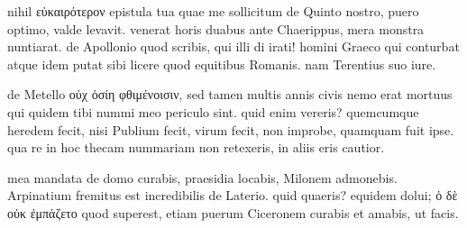 


 nihil εὐκαιρότερον epistula tua quae me sollicitum de Quinto nostro, puero optimo, valde levavit. venerat horis duabus ante Chaerippus, mera monstra nuntiarat. de Apollonio quod scribis, qui illi di irati! homini Graeco qui conturbat atque idem putat sibi licere quod equitibus Romanis. nam Terentius suo iure.

 de Metello οὐχ ὁσίη φθιμένοισιν, sed tamen multis annis civis nemo erat mortuus qui quidem tibi nummi meo periculo sint. quid enim vereris? quemcumque heredem fecit, nisi Publium fecit, virum fecit, non improbe, quamquam fuit ipse. qua re in hoc thecam nummariam non retexeris, in aliis eris cautior.

 mea mandata de domo curabis, praesidia locabis, Milonem admonebis. Arpinatium fremitus est incredibilis de Laterio. quid quaeris? equidem dolui; ὁ δὲ οὐκ ἐμπάζετο quod superest, etiam puerum Ciceronem curabis et amabis, ut facis.
